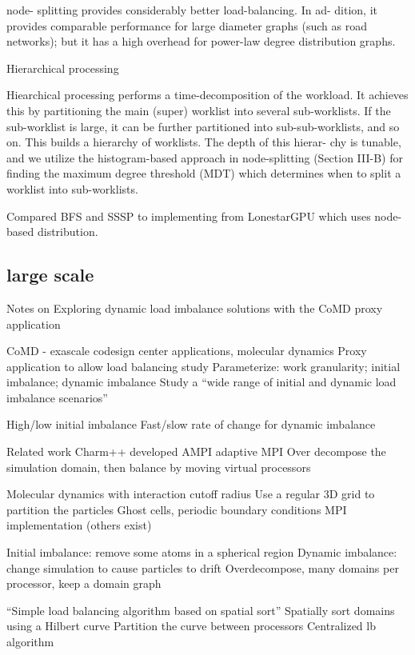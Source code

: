 \documentclass{article}
\begin{document}
node- splitting provides considerably better load-balancing. In ad- dition, it provides comparable performance for large diameter graphs (such as road networks); but it has a high overhead for power-law degree distribution graphs. 

Hierarchical processing

Hiearchical processing performs a time-decomposition of the workload. It achieves this by partitioning the main (super) worklist into several sub-worklists. If the sub-worklist is large, it can be further partitioned into sub-sub-worklists, and so on. This builds a hierarchy of worklists. The depth of this hierar- chy is tunable, and we utilize the histogram-based approach in node-splitting (Section III-B) for finding the maximum degree threshold (MDT) which determines when to split a worklist into sub-worklists. 

Compared BFS and SSSP to implementing from LonestarGPU which uses node-based distribution.


\subsection{large scale}

\cite{PEARCE2017}


Notes on Exploring dynamic load imbalance solutions with the CoMD proxy application 

CoMD - exascale codesign center applications, molecular dynamics
Proxy application to allow load balancing study
Parameterize: work granularity; initial imbalance; dynamic imbalance
Study a “wide range of initial and dynamic load imbalance scenarios”

High/low initial imbalance
Fast/slow rate of change for dynamic imbalance

Related work
Charm++ developed AMPI adaptive MPI
Over decompose the simulation domain, then balance by moving virtual processors

Molecular dynamics with interaction cutoff radius
Use a regular 3D grid to partition the particles
Ghost cells, periodic boundary conditions
MPI implementation (others exist)

Initial imbalance: remove some atoms in a spherical region
Dynamic imbalance: change simulation to cause particles to drift
Overdecompose, many domains per processor, keep a domain graph

“Simple load balancing algorithm based on spatial sort”
Spatially sort domains using a Hilbert curve
Partition the curve between processors
Centralized lb algorithm
\end{document}
